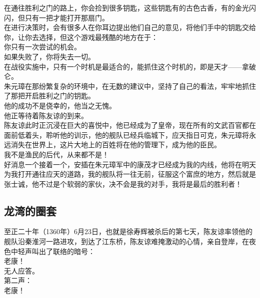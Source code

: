 \begin{multicols}{\theparacolNo}
在通往胜利之门的路上，你会捡到很多钥匙，这些钥匙有的古色古香，有的金光闪闪，但只有一把才能打开那扇门。\\

在进行决策时，会有很多人在你耳边提出他们自己的意见，将他们手中的钥匙交给你，让你去选择，但这个游戏最残酷的地方在于：\\

你只有一次尝试的机会。\\

如果失败了，你将失去一切。\\

在战役实施中，只有一个时机是最适合的，能抓住这个时机的，即是天才——拿破仑。\\

朱元璋在那纷繁复杂的环境中，在无数的建议中，坚持了自己的看法，牢牢地抓住了那把开启胜利之门的钥匙。\\

他的成功不是侥幸的，他当之无愧。\\

他正等待着陈友谅的到来。\\

陈友谅此时正沉浸在巨大的喜悦中，他已经成为了皇帝，现在所有的文武百官都在面前低着头，聆听他的训示，他的舰队已经兵临城下，应天指日可克，朱元璋将永远消失在世界上，这片大地上的百姓将在他的管理下，成为他的臣民。\\

我不是渔民的后代，从来都不是！\\

好消息一个接着一个，安插在朱元璋军中的康茂才已经成为我的内线，他将在明天为我打开通往应天的道路，我的舰队将一往无前，征服这个富庶的地方，然后就是张士诚，他不过是个软弱的家伙，决不会是我的对手，我将是最后的胜利者！\\

\subsection{龙湾的圈套}
至正二十年（1360年）6月23日，也就是徐寿辉被杀后的第七天，陈友谅率领他的舰队沿秦淮河一路进攻，到达了江东桥，陈友谅难掩激动的心情，亲自登岸，在夜色中轻声叫出了联络的暗号：\\

老康！\\

无人应答。\\

第二声：\\

老康！\\


\end{multicols}
